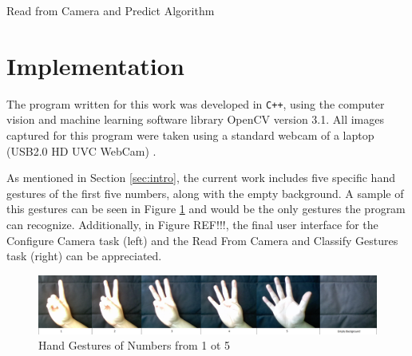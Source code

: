\documentclass[a4paper,10pt,english]{article}
\begin{document}
         \begin{algorithm}[H]
             \BlankLine
            \caption{Read from Camera and Predict Algorithm} \label{alg:read_camera_predict}
        \end{algorithm}
    
    \section{Implementation}
         The program written for this work was developed in \texttt{C++}, using the computer vision and machine learning software library OpenCV \cite{OpenCV} version 3.1. All images captured for this program were taken using a standard webcam of a laptop (USB2.0 HD UVC WebCam) .
         
         As mentioned in Section \ref{sec:intro}, the current work includes five specific hand gestures of the first five numbers, along with the empty background. A sample of this gestures can be seen in Figure \ref{fig:hand_gestures} and would be the only gestures the program can recognize. Additionally, in Figure REF!!!, the final user interface for the Configure Camera task (left) and the Read From Camera and Classify Gestures task (right) can be appreciated.
         
         \begin{figure}[h!]
             \centering
             \includegraphics[width=500pt]{images/hand_gestures}
             \caption{Hand Gestures of Numbers from 1 ot 5} \label{fig:hand_gestures}
        \end{figure}
         
\end{document}
